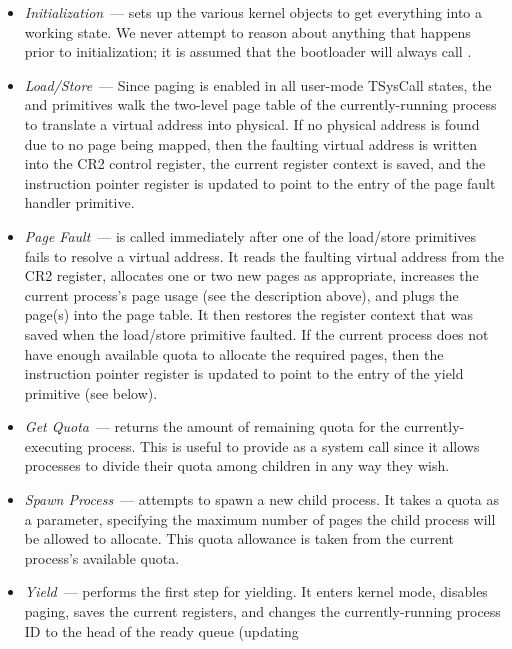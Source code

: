 \begin{itemize}
\item \emph{Initialization}~---  sets up the various kernel 
objects to get everything into a working state. We never attempt to 
reason about anything
that happens prior to initialization; it is assumed that the bootloader
will always call .
\item \emph{Load/Store}~--- Since paging is enabled in all user-mode 
TSysCall states, the  and  primitives walk the 
two-level page table of the currently-running process to
translate a virtual address into physical. If no physical address is
found due to no page being mapped, then the faulting virtual address is
written into the CR2 control register, the current register context
is saved, and the instruction pointer register is updated to point to 
the entry of the page fault handler primitive.
\item \emph{Page Fault}~---  is called immediately after one 
of the load/store primitives fails to resolve a virtual address. It reads
the faulting virtual address from the CR2 register, allocates one or two 
new pages as appropriate, increases the current process's page usage
(see the  description above),
and plugs the page(s) into the page table.
It then restores the register context that was saved when the 
load/store primitive faulted. If the current process does not
have enough available quota to allocate the required pages, then
the instruction pointer register is updated to point to the entry
of the yield primitive (see below). 
\item \emph{Get Quota}~---  returns the amount of remaining 
quota for the currently-executing process. This is useful to provide
as a system call since it allows processes to divide their
quota among children in any way they wish.
\item \emph{Spawn Process}~---  attempts to spawn a new 
child process. It takes a quota as a parameter, specifying the maximum number 
of pages the child process will be allowed to allocate. This quota allowance 
is taken from the current process's available quota.
\item \emph{Yield}~---  performs the first step for 
yielding. 
It enters kernel mode, disables paging, saves the current registers, and changes
the currently-running process ID to the head of the ready queue (updating

\end{itemize}
